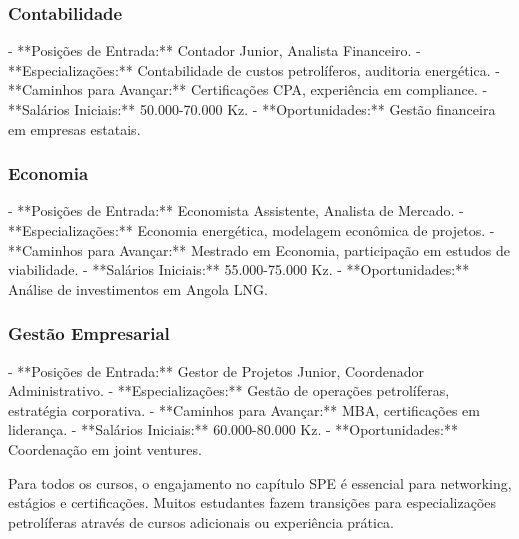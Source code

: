 \documentclass[12pt]{article}
\begin{document}
\subsubsection{Contabilidade}
- **Posições de Entrada:** Contador Junior, Analista Financeiro.
- **Especializações:** Contabilidade de custos petrolíferos, auditoria energética.
- **Caminhos para Avançar:** Certificações CPA, experiência em compliance.
- **Salários Iniciais:** 50.000-70.000 Kz.
- **Oportunidades:** Gestão financeira em empresas estatais.

\subsubsection{Economia}
- **Posições de Entrada:** Economista Assistente, Analista de Mercado.
- **Especializações:** Economia energética, modelagem econômica de projetos.
- **Caminhos para Avançar:** Mestrado em Economia, participação em estudos de viabilidade.
- **Salários Iniciais:** 55.000-75.000 Kz.
- **Oportunidades:** Análise de investimentos em Angola LNG.

\subsubsection{Gestão Empresarial}
- **Posições de Entrada:** Gestor de Projetos Junior, Coordenador Administrativo.
- **Especializações:** Gestão de operações petrolíferas, estratégia corporativa.
- **Caminhos para Avançar:** MBA, certificações em liderança.
- **Salários Iniciais:** 60.000-80.000 Kz.
- **Oportunidades:** Coordenação em joint ventures.

Para todos os cursos, o engajamento no capítulo SPE é essencial para networking, estágios e certificações. Muitos estudantes fazem transições para especializações petrolíferas através de cursos adicionais ou experiência prática.
\end{document}
